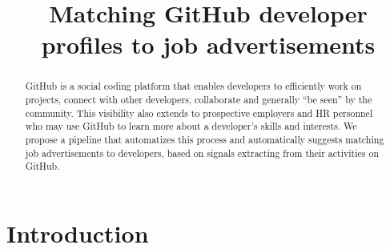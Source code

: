 \documentclass[conference]{IEEEtran}
\begin{document}
\newcommand{\ghtorrent}{ \textsc{ght}orrent\xspace}
\newcommand{\api}{\textsc{api}\xspace}

\newcommand{\nb}[3]{
  \fcolorbox{black}{#2}{\bfseries\sffamily\scriptsize#1}
    {\sf\small$\blacktriangleright$\textit{#3}$\blacktriangleleft$}
}

\newcommand\georgios[1]{\nb{Georgios}{yellow}{#1}}
\newcommand\claudia[1]{\nb{Claudia}{cyan}{#1}}
\newcommand\annotate[1]{\colorbox{Gray}{\color{white}[{#1}]}}

\newcommand{\hassanbox}[1]
{
  \vspace{0.29em}
  \noindent
  \fbox{
  \begin{minipage}{0.46\textwidth}
    \emph{\noindent #1}
    \end{minipage}
}}

\newcommand{\resp}[2]{{\sc R#1:} ``\emph{#2}''}
\newcommand{\respnum}[1]{{\sc R#1}}
\newcommand{\code}[1]{{\textsl{#1}}}

\title{Matching GitHub developer profiles to job advertisements}

\author{
\and
{}
}

\maketitle

\begin{abstract}
GitHub is a social coding platform that enables developers to efficiently work on projects, connect with other developers, collaborate and generally ``be seen'' by the community. This visibility also extends to prospective employers and HR personnel who may use GitHub to learn more about a developer's skills and interests. We propose a pipeline that automatizes this process and automatically suggests matching job advertisements to developers, based on signals extracting from their activities on GitHub.
\end{abstract}


\section{Introduction}
\end{document}

